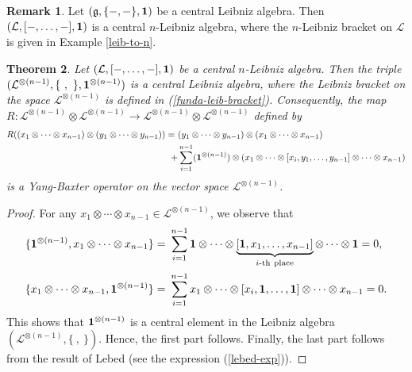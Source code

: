 \documentclass[a4paper,reqno,10pt]{amsart}
\theoremstyle{plain}
\newtheorem{thm}{Theorem}[section]
\theoremstyle{definition}
\newtheorem{remark}[thm]{Remark}
\theoremstyle{remark}
\begin{document}
\begin{remark}
Let $(\mathfrak{g}, \{ -, - \}, {\bf 1})$ be a central Leibniz algebra. Then $(\mathcal{L}, [-, \ldots, -], {\bf 1})$ is a central $n$-Leibniz algebra, where the $n$-Leibniz bracket on $\mathcal{L}$ is given in Example \ref{leib-to-n}.
\end{remark}

\begin{thm}
    Let $(\mathcal{L}, [-, \ldots, -], {\bf 1})$ be a central $n$-Leibniz algebra. Then the triple $(\mathcal{L}^{\otimes (n-1)}, \{ ~, ~ \} , {\bf 1}^{\otimes (n-1)})$ is a central Leibniz algebra, where the Leibniz bracket on the space $ \mathcal{L}^{\otimes (n-1)}$ is defined in (\ref{funda-leib-bracket}). Consequently, the map $R : \mathcal{L}^{\otimes (n-1)} \otimes \mathcal{L}^{\otimes (n-1)} \rightarrow \mathcal{L}^{\otimes (n-1)} \otimes \mathcal{L}^{\otimes (n-1)}$ defined by
    \begin{align*}
        R ((x_1 \otimes \cdots \otimes x_{n-1}) \otimes (y_1 \otimes \cdots \otimes y_{n-1}) ) =~& (y_1 \otimes \cdots \otimes y_{n-1}) \otimes (x_1 \otimes \cdots \otimes x_{n-1}) \\
        +& \sum_{i=1}^{n-1} ({\bf 1}^{\otimes (n-1)}) \otimes (x_1 \otimes \cdots \otimes [x_i, y_1, \ldots, y_{n-1}] \otimes \cdots \otimes x_{n-1})
    \end{align*}
    is a Yang-Baxter operator on the vector space $\mathcal{L}^{\otimes (n-1)}$.
\end{thm}

\begin{proof}
    For any $x_1 \otimes \cdots \otimes x_{n-1} \in \mathcal{L}^{\otimes (n-1)}$, we observe that
    \begin{align*}
    \{ {\bf 1}^{\otimes (n-1)} , x_1 \otimes \cdots \otimes x_{n-1}  \} =~& \sum_{i=1}^{n-1} {\bf 1} \otimes \cdots \otimes \underbrace{[{\bf 1}, x_1, \ldots, x_{n-1}]}_{i\text{-}\mathrm{th~ place}} \otimes \cdots \otimes {\bf 1} = 0,\\
        \{ x_1 \otimes \cdots \otimes x_{n-1} , {\bf 1}^{\otimes (n-1)} \} =~& \sum_{i=1}^{n-1} x_1 \otimes \cdots \otimes [x_i, {\bf 1}, \ldots, {\bf 1}] \otimes \cdots \otimes x_{n-1} = 0.
    \end{align*}
    This shows that ${\bf 1}^{\otimes (n-1)}$ is a central element in the Leibniz algebra $(\mathcal{L}^{\otimes (n-1)}, \{ ~, ~ \})$. Hence, the first part follows. Finally, the last part follows from the result of Lebed (see the expression (\ref{lebed-exp})).
\end{proof}
\end{document}
